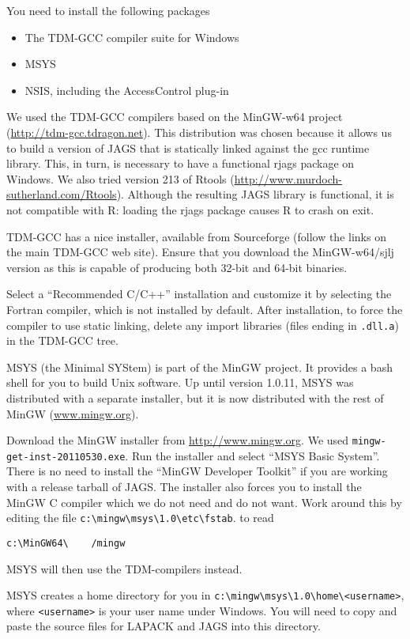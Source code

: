 \documentclass[11pt, a4paper, titlepage]{article}
\newcommand{\JAGS}{\textsf{JAGS}}
\begin{document}
You need to install the following packages
\begin{itemize}
\item The TDM-GCC compiler suite for Windows
\item MSYS  
\item NSIS, including the AccessControl plug-in  
\end{itemize}

We used the TDM-GCC compilers based on the MinGW-w64 project
(\url{http://tdm-gcc.tdragon.net}).  This distribution was chosen
because it allows us to build a version of JAGS that is statically
linked against the gcc runtime library.  This, in turn, is necessary
to have a functional rjags package on Windows.  We also tried version
213 of Rtools
(\url{http://www.murdoch-sutherland.com/Rtools}). Although the
resulting JAGS library is functional, it is not compatible with R:
loading the rjags package causes R to crash on exit.

TDM-GCC has a nice installer, available from Sourceforge (follow the
links on the main TDM-GCC web site). Ensure that you download the
MinGW-w64/sjlj version as this is capable of producing both 32-bit and
64-bit binaries.

Select a ``Recommended C/C++'' installation and customize it by
selecting the Fortran compiler, which is not installed by
default. After installation, to force the compiler to use static
linking, delete any import libraries (files ending in \verb+.dll.a+)
in the TDM-GCC tree.  

MSYS (the Minimal SYStem) is part of the MinGW project. It provides a
bash shell for you to build Unix software. Up until version 1.0.11,
MSYS was distributed with a separate installer, but it is now distributed
with the rest of MinGW (\url{www.mingw.org}).

Download the MinGW installer from \url{http://www.mingw.org}. We used
\texttt{mingw-get-inst-20110530.exe}.  Run the installer and select
``MSYS Basic System''.  There is no need to install the ``MinGW
Developer Toolkit'' if you are working with a release tarball of
\JAGS.  The installer also forces you to install the MinGW C compiler
which we do not need and do not want.  Work around this by
editing the file \verb+c:\mingw\msys\1.0\etc\fstab+. to read
\begin{verbatim}
c:\MinGW64\    /mingw
\end{verbatim}
MSYS will then use the TDM-compilers instead.

MSYS creates a home directory for you in
\verb+c:\mingw\msys\1.0\home\<username>+, where \texttt{<username>} is
your user name under Windows. You will need to copy and paste the
source files for LAPACK and JAGS into this directory.
\end{document}
